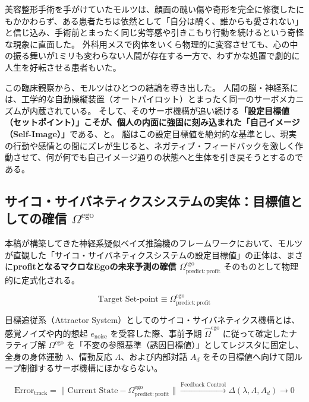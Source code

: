 美容整形手術を手がけていたモルツは、顔面の醜い傷や奇形を完全に修復したにもかかわらず、ある患者たちは依然として「自分は醜く、誰からも愛されない」と信じ込み、手術前とまったく同じ劣等感や引きこもり行動を続けるという奇怪な現象に直面した。
外科用メスで肉体をいくら物理的に変容させても、心の中の振る舞いが1ミリも変わらない人間が存在する一方で、わずかな処置で劇的に人生を好転させる患者もいた。

この臨床観察から、モルツはひとつの結論を導き出した。
人間の脳・神経系には、工学的な自動操縦装置（オートパイロット）とまったく同一のサーボメカニズムが内蔵されている。
そして、そのサーボ機構が追い続ける\textbf{「設定目標値（セットポイント）」こそが、個人の内面に強固に刻み込まれた「自己イメージ（Self-Image）」}である、と。
脳はこの設定目標値を絶対的な基準とし、現実の行動や感情との間にズレが生じると、ネガティブ・フィードバックを激しく作動させて、何が何でも自己イメージ通りの状態へと生体を引き戻そうとするのである。

\subsection{サイコ・サイバネティクスシステムの実体：目標値としての確信 $\Omega^{\mathrm{ego}}$}

本稿が構築してきた神経系疑似ベイズ推論機のフレームワークにおいて、モルツが直観した「サイコ・サイバネティクスシステムの設定目標値」の正体は、まさに\textbf{profitとなるマクロなEgoの未来予測の確信 $\Omega^{\mathrm{ego}}_{\mathrm{predict:profit}}$} そのものとして物理的に定式化される。

\begin{equation}
    \text{Target Set-point} \equiv \Omega^{\mathrm{ego}}_{\mathrm{predict:profit}}
\end{equation}

目標追従系（Attractor System）としてのサイコ・サイバネティクス機構とは、感覚ノイズや内的想起 $e_{\mathrm{noise}}$ を受容した際、事前予期 $\hat{\Omega}^{\mathrm{ego}}$ に従って確定したナラティブ解 $\Omega^{\mathrm{ego}}$ を「不変の参照基準（誘因目標値）」としてレジスタに固定し、全身の身体運動 $\lambda$、情動反応 $\Lambda$、および内部対話 $A_d$ をその目標値へ向けて閉ループ制御するサーボ機構にほかならない。

\begin{equation}
    \text{Error}_{\mathrm{track}} = \| \text{Current State} - \Omega^{\mathrm{ego}}_{\mathrm{predict:profit}} \| \xrightarrow{\text{Feedback Control}} \Delta (\lambda, \Lambda, A_d) \longrightarrow 0
\end{equation}


